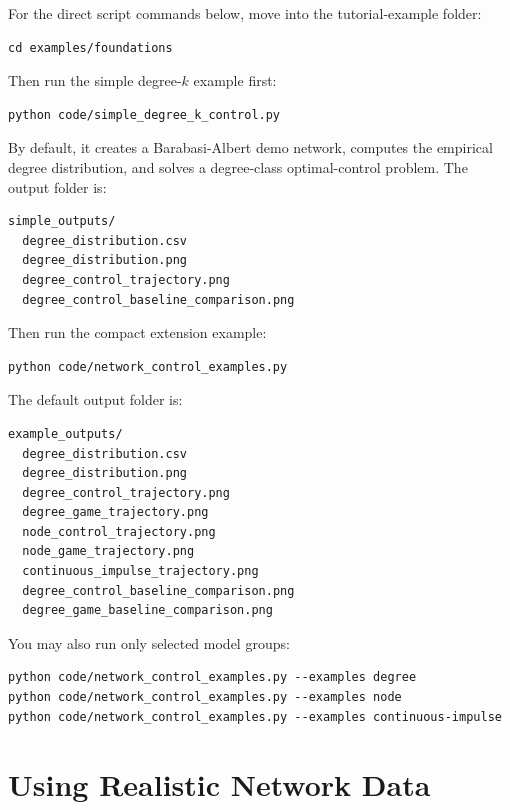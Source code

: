 \documentclass[11pt,a4paper]{article}
\begin{document}
For the direct script commands below, move into the tutorial-example folder:

\begin{lstlisting}[style=bash]
cd examples/foundations
\end{lstlisting}

Then run the simple degree-\(k\) example first:

\begin{lstlisting}[style=bash]
python code/simple_degree_k_control.py
\end{lstlisting}

By default, it creates a Barabasi-Albert demo network, computes the empirical degree distribution, and solves a degree-class optimal-control problem. The output folder is:

\begin{lstlisting}[style=text]
simple_outputs/
  degree_distribution.csv
  degree_distribution.png
  degree_control_trajectory.png
  degree_control_baseline_comparison.png
\end{lstlisting}

Then run the compact extension example:

\begin{lstlisting}[style=bash]
python code/network_control_examples.py
\end{lstlisting}

The default output folder is:

\begin{lstlisting}[style=text]
example_outputs/
  degree_distribution.csv
  degree_distribution.png
  degree_control_trajectory.png
  degree_game_trajectory.png
  node_control_trajectory.png
  node_game_trajectory.png
  continuous_impulse_trajectory.png
  degree_control_baseline_comparison.png
  degree_game_baseline_comparison.png
\end{lstlisting}

You may also run only selected model groups:

\begin{lstlisting}[style=bash]
python code/network_control_examples.py --examples degree
python code/network_control_examples.py --examples node
python code/network_control_examples.py --examples continuous-impulse
\end{lstlisting}

\section{Using Realistic Network Data}
\end{document}
